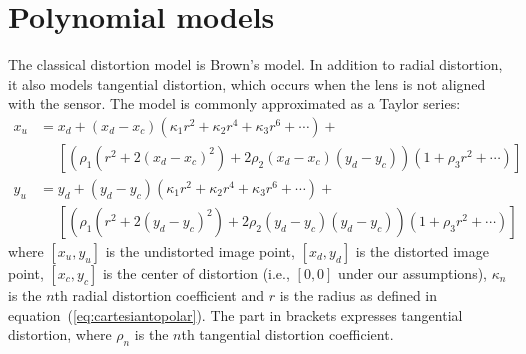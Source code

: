 \documentclass[english,12pt]{ifimaster}
\begin{document}

\section{Polynomial models}

The classical distortion model is Brown's model. In addition to radial
distortion, it also models tangential distortion, which occurs when
the lens is not aligned with the sensor. The model is commonly
approximated as a Taylor series:
\begin{equation}
  \label{eq:brown}
  \begin{split}
    x_u &= x_d + (x_d - x_c)(\kappa_1r^2 + \kappa_2r^4 + \kappa_3r^6 + \dotsb) + {} \\
    &\phantom{{}={}} [(\rho_1(r^2 + 2(x_d - x_c)^2) + 2\rho_2(x_d - x_c)(y_d - y_c))(1 + \rho_3r^2 + \dotsb)]\\
    y_u &= y_d + (y_d - y_c)(\kappa_1r^2 + \kappa_2r^4 + \kappa_3r^6 + \dotsb) + {} \\
    &\phantom{{}={}} [(\rho_1(r^2 + 2(y_d - y_c)^2) + 2\rho_2(y_d - y_c)(y_d - y_c))(1 + \rho_3r^2 + \dotsb)]
  \end{split}
\end{equation}
where $[x_u, y_u]$ is the undistorted image point, $[x_d, y_d]$ is the
distorted image point, $[x_c, y_c]$ is the center of distortion (i.e.,
$[0, 0]$ under our assumptions), $\kappa_n$ is the $n$th radial distortion
coefficient and $r$ is the radius as defined in
equation~(\ref{eq:cartesiantopolar}). The part in brackets expresses
tangential distortion, where $\rho_n$ is the $n$th tangential distortion
coefficient.
\end{document}

